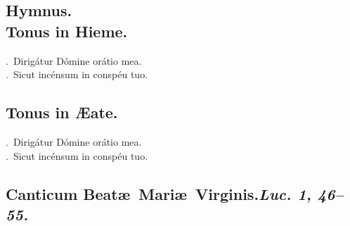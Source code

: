 \documentclass[12pt]{article} %
\newenvironment{response}{\leftskip 0in \setlength{\parindent}{0in}}{\vspace{1 mm}}
\let\oldVbar\Vbar
\renewcommand{\Vbar}{\textcolor{benred8}{\oldVbar .}}
\let\oldRbar\Rbar
\renewcommand{\Rbar}{\textcolor{benred8}{\oldRbar .}}
\def\capitulumSpace{\hspace{20 mm}}
\begin{document}
\subsection*{Hymnus.\\Tonus in Hieme.}


\gresetfirstlineaboveinitial{\small \textsc{ \textbf{\textcolor{benred8}{VIII}}}}{\small \textsc{ \textbf{\textcolor{benred8}{VIII}}}}

\begin{response}
\Vbar\ Dirig\'{a}tur D\'{o}mine or\'{a}tio mea.\\
\Rbar\ Sicut inc\'{e}nsum in consp\'{e}u tuo.

\end{response}


\subsection*{}

\subsection*{Tonus in \AE {}ate.}


\gresetfirstlineaboveinitial{\small \textsc{ \textbf{\textcolor{benred8}{I}}}}{\small \textsc{ \textbf{\textcolor{benred8}{I}}}}

\begin{response}
\Vbar\ Dirig\'{a}tur D\'{o}mine or\'{a}tio mea.\\
\Rbar\ Sicut inc\'{e}nsum in consp\'{e}u tuo.

\end{response}


\subsection*{}

\subsection*{Canticum Beat\ae\ Mari\ae\ Virginis.\capitulumSpace \emph{Luc. 1, 46--55.}}
\end{document}
